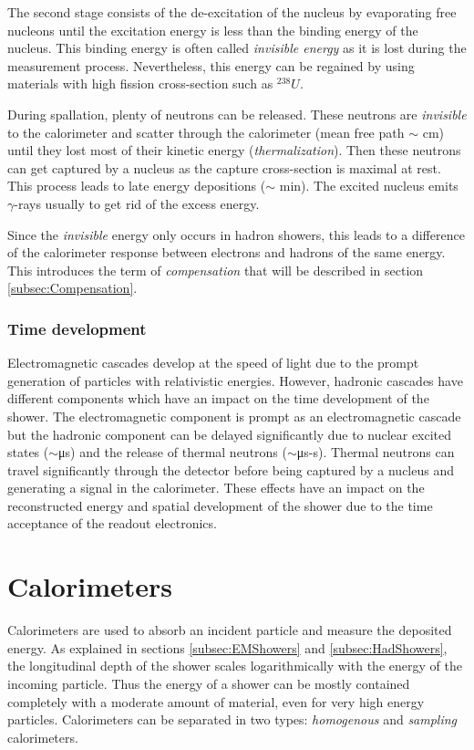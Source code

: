 The second stage consists of the de-excitation of the nucleus by evaporating free nucleons until the excitation energy is less than the binding energy of the nucleus. This binding energy is often called \textit{invisible energy} as it is lost during the measurement process. Nevertheless, this energy can be regained by using materials with high fission cross-section such as $^{238}U$.

During spallation, plenty of neutrons can be released. These neutrons are \textit{invisible} to the calorimeter and scatter through the calorimeter (mean free path $\sim$ cm) until they lost most of their kinetic energy (\textit{thermalization}). Then these neutrons can get captured by a nucleus as the capture cross-section is maximal at rest. This process leads to late energy depositions ($\sim$ min). The excited nucleus emits $\gamma$-rays usually to get rid of the excess energy.

Since the \textit{invisible} energy only occurs in hadron showers, this leads to a difference of the calorimeter response between electrons and hadrons of the same energy. This introduces the term of \textit{compensation} that will be described in section \ref{subsec:Compensation}.

\subsubsection{Time development}
\label{sec:TimeDevShowers}

Electromagnetic cascades develop at the speed of light due to the prompt generation of particles with relativistic energies. However, hadronic cascades have different components which have an impact on the time development of the shower. The electromagnetic component is prompt as an electromagnetic cascade but the hadronic component can be delayed significantly due to nuclear excited states ($\sim$\si{\micro\second}) and the release of thermal neutrons ($\sim$\si{\micro\second}-\si{\second}). Thermal neutrons can travel significantly through the detector before being captured by a nucleus and generating a signal in the calorimeter. These effects have an impact  on the reconstructed energy and spatial development of the shower due to the time acceptance of the readout electronics.

\section{Calorimeters}

Calorimeters are used to absorb an incident particle and measure the deposited energy. As explained in sections \ref{subsec:EMShowers} and \ref{subsec:HadShowers}, the longitudinal depth of the shower scales logarithmically with the energy of the incoming particle. Thus the energy of a shower can be mostly contained completely with a moderate amount of material, even for very high energy particles. Calorimeters can be separated in two types: \textit{homogenous} and \textit{sampling} calorimeters.


